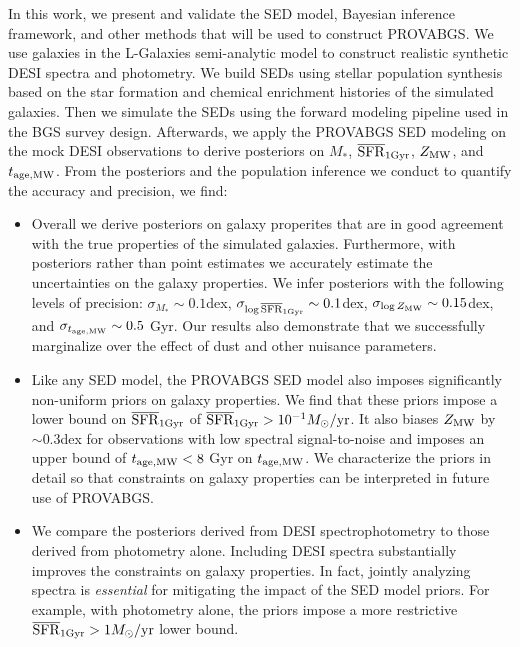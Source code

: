 In this work, we present and validate the SED model, Bayesian inference
framework, and other methods that will be used to construct PROVABGS.
We use  galaxies in the {\sc L-Galaxies} semi-analytic model to
construct realistic synthetic DESI spectra and photometry.  
We build SEDs using stellar population synthesis based on the star formation
and chemical enrichment histories of the simulated galaxies.
Then we simulate the SEDs using the forward modeling pipeline used in the BGS
survey design.  
Afterwards, we apply the PROVABGS SED modeling on the mock DESI observations to
derive posteriors on $M_*$, $\overline{\rm SFR}_{\rm 1Gyr}$, $Z_{\rm MW}$, and $t_{\rm age, MW}$. 
From the posteriors and the population inference we conduct to quantify the
accuracy and precision, we find: 
\begin{itemize}
    \item Overall we derive posteriors on galaxy properites that are in good
        agreement with the true properties of the simulated galaxies. 
        Furthermore, with posteriors rather than point estimates we accurately
        estimate the uncertainties on the galaxy properties. 
        We infer posteriors with the following levels of precision: 
        $\sigma_{M_*}\sim0.1$dex, $\sigma_{\log\overline{\rm SFR}_{\rm 1Gyr}}\sim0.1$dex, 
        $\sigma_{\log Z_{\rm MW}}\sim0.15$dex, and $\sigma_{t_{\rm age, MW}}\sim0.5$ Gyr. 
        Our results also demonstrate that we successfully marginalize over the
        effect of dust and other nuisance parameters. 
    \item Like any SED model, the PROVABGS SED model also imposes significantly
        non-uniform priors on galaxy properties. 
        We find that these priors impose a lower bound on $\overline{\rm SFR}_{\rm 1Gyr}$ of 
        $\overline{\rm SFR}_{\rm 1Gyr} > 10^{-1}M_\odot/{\rm yr}$. 
        It also biases $Z_{\rm MW}$ by ${\sim}0.3$dex for observations with low
        spectral signal-to-noise and imposes an upper bound of $t_{\rm age, MW} < 8$ Gyr
        on $t_{\rm age, MW}$. 
        We characterize the priors in detail so that constraints on galaxy
        properties can be interpreted in future use of PROVABGS. 
    \item We compare the posteriors derived from DESI spectrophotometry to
        those derived from photometry alone. 
        Including DESI spectra substantially improves the constraints on galaxy
        properties. 
        In fact, jointly analyzing spectra is {\em essential} for mitigating
        the impact of the SED model priors. 
        For example, with photometry alone, the priors impose a more
        restrictive $\overline{\rm SFR}_{\rm 1Gyr} > 1 M_\odot/{\rm yr}$ lower bound. 
\end{itemize}

